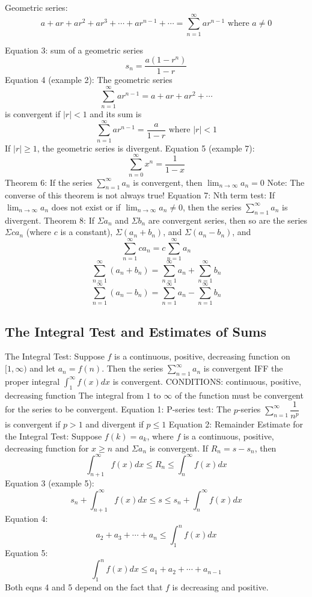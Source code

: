 \documentclass{article}
\begin{document}
        \begin{outline}
            \1 Geometric series: \[a+ar+ar^2+ar^3+\cdots+ar^{n-1}+\cdots=\sum^\infty_{n=1}ar^{n-1}\mbox{ where }a\neq0\]
        \end{outline}\begin{multicols}{2}
            \begin{outline}
        \1 Equation 3: sum of a geometric series \[s_n=\dfrac{a\left(1-r^n\right)}{1-r}\]
        \1 Equation 4 (example 2): The geometric series \[\sum^\infty_{n=1}ar^{n-1}=a+ar+ar^2+\cdots\] is convergent if \(|r|<1\) and its sum is \[\sum^\infty_{n=1}ar^{n-1}=\dfrac{a}{1-r}\mbox{ where }|r|<1\] If \(|r|\geq1\), the geometric series is divergent. 
        \1 Equation 5 (example 7): \[\sum^\infty_{n=0}x^n=\dfrac{1}{1-x}\]
        \1 Theorem 6: If the series \(\sum^\infty_{n=1}a_n\) is convergent, then \(\lim_{n\to\infty}a_n=0\)
            \2 Note: The converse of this theorem is not always true!
        \1 Equation 7: Nth term test: If \(\lim_{n\to\infty}a_n\) does not exist or if \(\lim_{n\to\infty}a_n\neq0\), then the series \(\sum_{n=1}^\infty a_n\) is divergent. 
        \1 Theorem 8: If \(\Sigma a_n\) and \(\Sigma b_n\) are convergent series, then so are the series \(\Sigma ca_n\) (where $c$ is a constant), \(\Sigma\left(a_n+b_n\right)\), and \(\Sigma\left(a_n-b_n\right)\), and \[\sum^\infty_{n=1}ca_n=c\sum^\infty_{n=1}a_n\]\[\sum^\infty_{n=1}\left(a_n+b_n\right)=\sum^\infty_{n=1}a_n+\sum^\infty_{n=1}b_n\]\[\sum^\infty_{n=1}\left(a_n-b_n\right)=\sum^\infty_{n=1}a_n-\sum^\infty_{n=1}b_n\]

    \end{outline}
    \subsection{The Integral Test and Estimates of Sums}
    \begin{outline}
        \1 The Integral Test: Suppose $f$ is a continuous, positive, decreasing function on \([1,\infty)\) and let \(a_n=f(n)\). Then the series \(\sum^\infty_{n=1}a_n\) is convergent IFF the proper integral \(\int^\infty_1f(x)dx\) is convergent. 
            \2 CONDITIONS: continuous, positive, decreasing function 
            \2 The integral from $1$ to $\infty$ of the function must be convergent for the series to be convergent. 
        \1 Equation 1: P-series test: The $p$-series \(\sum^\infty_{n=1}\dfrac{1}{n^p}\) is convergent if \(p>1\) and divergent if \(p\leq1\)
        \1 Equation 2: Remainder Estimate for the Integral Test: Suppose \(f(k)=a_k\), where $f$ is a continuous, positive, decreasing function for \(x\geq n\) and \(\Sigma a_n\) is convergent. If \(R_n=s-s_n\), then \[\int^\infty_{n+1}f(x)dx\leq R_n\leq\int^\infty_n f(x)dx\]
        \1 Equation 3 (example 5): \[s_n+\int^\infty_{n+1}f(x)dx\leq s\leq s_n+\int^\infty_nf(x)dx\]
        \1 Equation 4: \[a_2+a_3+\cdots+a_n\leq\int^n_1f(x)dx\]
        \1 Equation 5: \[\int^n_1f(x)dx\leq a_1+a_2+\cdots+a_{n-1}\]
            \2 Both eqns 4 and 5 depend on the fact that $f$ is decreasing and positive. 
    \end{outline}

\end{multicols}
\end{document}
